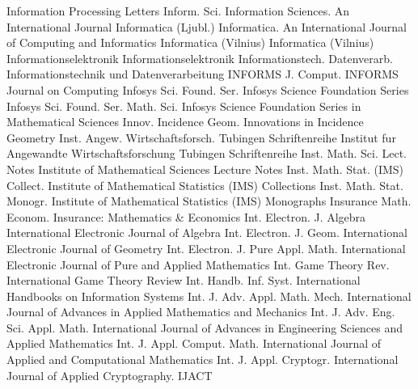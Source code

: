 {Information Processing Letters}
{Inform. Sci.}
{Information Sciences. An International Journal}
{Informatica (Ljubl.)}
{Informatica. An International Journal of Computing and Informatics}
{Informatica (Vilnius)}
{Informatica (Vilnius)}
{Informationselektronik}
{Informationselektronik}
{Informationstech. Datenverarb.}
{Informationstechnik und Datenverarbeitung}
{INFORMS J. Comput.}
{INFORMS Journal on Computing}
{Infosys Sci. Found. Ser.}
{Infosys Science Foundation Series}
{Infosys Sci. Found. Ser. Math. Sci.}
{Infosys Science Foundation Series in Mathematical Sciences}
{Innov. Incidence Geom.}
{Innovations in Incidence Geometry}
{Inst. Angew. Wirtschaftsforsch. Tubingen Schriftenreihe}
{Institut fur Angewandte Wirtschaftsforschung Tubingen Schriftenreihe}
{Inst. Math. Sci. Lect. Notes}
{Institute of Mathematical Sciences Lecture Notes}
{Inst. Math. Stat. (IMS) Collect.}
{Institute of Mathematical Statistics (IMS) Collections}
{Inst. Math. Stat. Monogr.}
{Institute of Mathematical Statistics (IMS) Monographs}
{Insurance Math. Econom.}
{Insurance: Mathematics & Economics}
{Int. Electron. J. Algebra}
{International Electronic Journal of Algebra}
{Int. Electron. J. Geom.}
{International Electronic Journal of Geometry}
{Int. Electron. J. Pure Appl. Math.}
{International Electronic Journal of Pure and Applied Mathematics}
{Int. Game Theory Rev.}
{International Game Theory Review}
{Int. Handb. Inf. Syst.}
{International Handbooks on Information Systems}
{Int. J. Adv. Appl. Math. Mech.}
{International Journal of Advances in Applied Mathematics and Mechanics}
{Int. J. Adv. Eng. Sci. Appl. Math.}
{International Journal of Advances in Engineering Sciences and Applied Mathematics}
{Int. J. Appl. Comput. Math.}
{International Journal of Applied and Computational Mathematics}
{Int. J. Appl. Cryptogr.}
{International Journal of Applied Cryptography. IJACT}
